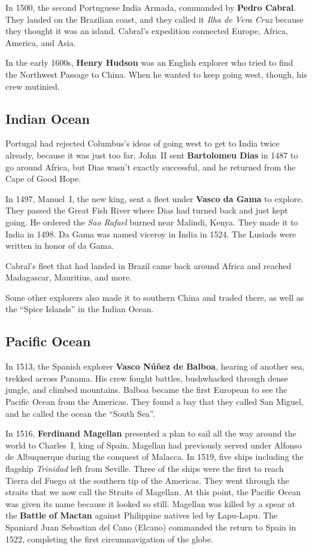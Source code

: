 In 1500, the second Portuguese India Armada, commanded by \textbf{Pedro Cabral}.
They landed on the Brazilian coast,
and they called it \textit{Ilha de Vera Cruz} because they thought it was an island.
Cabral's expedition connected Europe, Africa, America, and Asia.

In the early 1600s, \textbf{Henry Hudson} was an English explorer who tried to find the Northwest Passage to China.
When he wanted to keep going west, though, his crew mutinied.

\subsection*{Indian Ocean}

Portugal had rejected Columbus's ideas of going west to get to India twice already,
because it was just too far.
John~II sent \textbf{Bartolomeu Dias} in 1487 to go around Africa,
but Dias wasn't exactly successful, and he returned from the Cape of Good Hope.

In 1497, Manuel~I, the new king, sent a fleet under \textbf{Vasco da Gama} to explore.
They passed the Great Fish River where Dias had turned back and just kept going.
He ordered the \textit{Sao Rafael} burned near Malindi, Kenya.
They made it to India in 1498.
Da Gama was named viceroy in India in 1524.
The Lusiads were written in honor of da Gama.

Cabral's fleet that had landed in Brazil came back around Africa
and reached Madagascar, Mauritius, and more.

Some other explorers also made it to southern China and traded there,
as well as the ``Spice Islands'' in the Indian Ocean.

\subsection*{Pacific Ocean}

In 1513, the Spanish explorer \textbf{Vasco N\'u\~nez de Balboa},
hearing of another sea, trekked across Panama.
His crew fought battles, bushwhacked through dense jungle, and climbed mountains.
Balboa became the first European to see the Pacific Ocean from the Americas.
They found a bay that they called San Miguel, and he called the ocean the ``South Sea''.

In 1516, \textbf{Ferdinand Magellan} presented a plan
to sail all the way around the world to Charles~I, king of Spain.
Magellan had previously served under Alfonso de Albuquerque during the conquest of Malacca.
In 1519, five ships including the flagship \textit{Trinidad} left from Seville.
Three of the ships were the first to reach Tierra del Fuego at the southern tip of the Americas.
They went through the straits that we now call the Straits of Magellan.
At this point, the Pacific Ocean was given its name because it looked so still.
Magellan was killed by a spear at the \textbf{Battle of Mactan} against Philippine natives led by Lapu-Lapu.
The Spaniard Juan Sebastian del Cano (Elcano) commanded the return to Spain in 1522,
completing the first circumnavigation of the globe.

